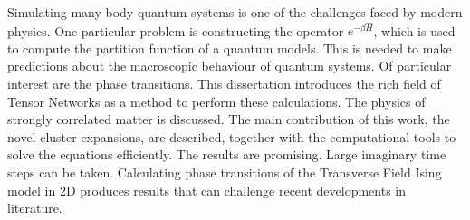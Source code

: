 Simulating many-body quantum systems is one of the challenges faced by modern physics. One particular problem is constructing the operator $e^{-\beta \hat{H}}$, which is used to compute the partition function of a quantum models.  This is needed to make predictions about the macroscopic behaviour of quantum systems. Of particular interest are the phase transitions. This dissertation introduces the rich field of Tensor Networks as a method to perform these calculations. The physics of strongly correlated matter is discussed. The main contribution of this work, the novel cluster expansions, are described, together with the computational tools to solve the equations efficiently. The results are promising. Large imaginary time steps can be taken. Calculating phase transitions of the Transverse Field Ising model in 2D produces results that can challenge recent developments in literature.
